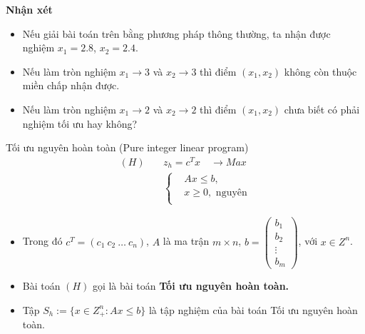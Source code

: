 \documentclass[10pt]{beamer}
\begin{document}
\begin{frame}{\bf Nhận xét}
\begin{itemize}
\item<1-> Nếu giải bài toán trên bằng phương pháp thông thường, ta nhận được nghiệm $x_1=2.8$, $x_2=2.4$.
\medskip
      
      \item<2-> Nếu làm tròn nghiệm $x_1 \to 3$ và $x_2 \to 3$ thì điểm $(x_1,x_2)$ không còn thuộc miền chấp nhận được.
      
 \medskip
      
      \item<3-> Nếu làm tròn nghiệm $x_1 \to 2$ và $x_2 \to 2$ thì điểm $(x_1,x_2)$ chưa biết có phải nghiệm tối ưu hay không?
\end{itemize}
      
\bigskip
   
\end{frame}







\begin{frame}{Tối ưu nguyên hoàn toàn (Pure integer linear program)}
    \begin{equation} \label{H}
        \begin{split}
        (H) \quad & z_h=c^Tx \quad \longrightarrow Max \\
                  & \left\{\begin{split}
                    &Ax \leq  b, \\
                    &x \geq 0, \text{ nguyên} \\
                    \end{split}\right.
        \end{split}
        \end{equation}            
    \begin{itemize} \small
    \item Trong đó $c^T=(c_1 \: c_2 \: \ldots \: c_n)$, $A$ là ma trận $m\times n$, $b=\begin{pmatrix}
        b_1 \\
        b_2 \\
        \vdots \\
        b_m
        \end{pmatrix}$, với $x\in Z^n$.
    \item Bài toán $(H)$ gọi là bài toán \textbf{Tối ưu nguyên hoàn toàn.}
    \item Tập $S_h:=\{x\in Z^n_+: Ax\leq b\}$ là tập nghiệm của bài toán Tối ưu nguyên hoàn toàn.
    \end{itemize}
\end{frame}
\end{document}

